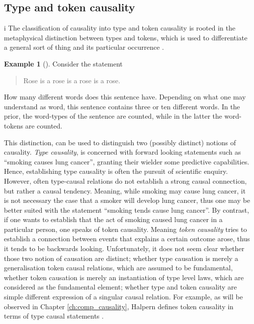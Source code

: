 \documentclass[11pt,a4paper]{book}
\theoremstyle{definition}
\theoremstyle{definition}
\newtheorem{example}{Example}[section]
\theoremstyle{definition}
\theoremstyle{remark}
\begin{document}
\subsection{Type and token causality} i
The classification of causality into type and token causality is rooted in the metaphysical distinction between types and tokens, which is used to differentiate a general sort of thing and its particular occurrence \cite{wetzel2018typetoken}.

\begin{example}[\cite{hausman2005causal}]
Consider the statement 
\begin{quote}
Rose is a rose is a rose is a rose.
\end{quote}
How many different words does this sentence have.  Depending on what one may understand as word, this sentence contains three or ten different words. In the prior, the word-types of the sentence are counted, while in the latter the word-tokens are counted. 
\end{example}

This distinction, can be used to distinguish two (possibly distinct) notions of  causality. \emph{Type causality}, is concerned with forward looking statements such as ``smoking causes lung cancer'', granting their wielder some predictive capabilities. Hence, establishing type causality is often the pursuit of scientific enquiry. However, often type-causal relations do not establish a strong causal connection, but rather a causal tendency. Meaning, while smoking may cause lung cancer, it is not necessary the case that a smoker will develop lung cancer, thus one may be better suited with the statement ``smoking tends cause lung cancer''. By contrast, if one wants to establish that the act of smoking caused lung cancer in a particular person, one speaks of token causality. Meaning \emph{token causality} tries to establish a connection between events that explains a certain outcome arose, thus it tends to be backwards looking.
Unfortunately, it does not seem clear whether those two notion of causation are distinct; whether type causation is merely a generalisation token causal relations, which are assumed to be fundamental, whether token causation is merely an instantiation of type level laws, which are considered as the fundamental element; whether type and token causality are simple different expression of a singular causal relation. 
For example, as will be observed in Chapter \ref{ch:comp_causality},  Halpern defines token causality in terms of type causal statements \cite{hausman2005causal,halpern2016actual}. 
\end{document}
